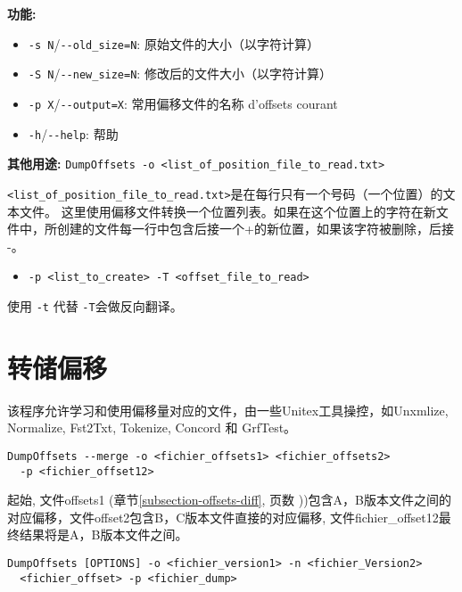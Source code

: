 \bigskip
\noindent \textbf{功能:}
	  	 
\begin{itemize} 	 
  \item \verb+-s N+/\verb+--old_size=N+: 原始文件的大小（以字符计算）
  \item \verb+-S N+/\verb+--new_size=N+: 修改后的文件大小（以字符计算）
  \item \verb+-p X+/\verb+--output=X+: 常用偏移文件的名称 d'offsets courant	 
  \item \verb+-h+/\verb+--help+: 帮助	 
\end{itemize} 	 

\bigskip
\noindent \textbf{其他用途:} \verb+DumpOffsets -o <list_of_position_file_to_read.txt>+

\bigskip
\noindent \verb+<list_of_position_file_to_read.txt>+是在每行只有一个号码（一个位置）的文本文件。 
\bigskip
\noindent 这里使用偏移文件转换一个位置列表。如果在这个位置上的字符在新文件中，所创建的文件每一行中包含后接一个+的新位置，如果该字符被删除，后接 -。
	  
	  	 
\begin{itemize}
  \item \verb+-p <list_to_create> -T <offset_file_to_read>+
\end{itemize} 	 

\noindent 使用 \verb+-t+ 代替 \verb+-T+会做反向翻译。 





\section{转储偏移}
\label{section-DumpOffsets}

\noindent 该程序允许学习和使用偏移量对应的文件，由一些Unitex工具操控，如Unxmlize, Normalize, Fst2Txt, Tokenize, Concord 和 GrfTest。
\bigskip
\begin{verbatim}
DumpOffsets --merge -o <fichier_offsets1> <fichier_offsets2>
  -p <fichier_offset12>
\end{verbatim}
起始, 文件offsets1 (章节\ref{subsection-offsets-diff}, 页数 \pageref{subsection-offsets-diff}))包含A，B版本文件之间的对应偏移，文件offset2包含B，C版本文件直接的对应偏移, 文件fichier\_offset12最终结果将是A，B版本文件之间。 

\begin{verbatim}
DumpOffsets [OPTIONS] -o <fichier_version1> -n <fichier_Version2>
  <fichier_offset> -p <fichier_dump>
\end{verbatim}
\bigskip

